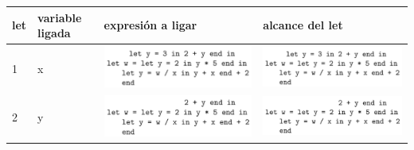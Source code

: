 \documentclass{article}
\begin{document}
\begin{enumerate}
{\begin{enumerate}
{            		\begin{table}[H]
            			\centering
            			\begin{tabular}{|l|l|l|l|}
            				\hline
            				let & variable ligada & expresión a ligar & alcance del let \\ \hline
            				1   & x               & 
            				\begin{minipage}{.3\textwidth}
            					\includegraphics[width=\linewidth, height=.25\linewidth]{x1.png}
            				\end{minipage}
            			     & \begin{minipage}{.3\textwidth}
            			         \includegraphics[width=\linewidth, 
            			        height=.25\linewidth]{x1.png}
            		       \end{minipage}                \\ \hline
            				2   & y               & \begin{minipage}{.3\textwidth}
            					\includegraphics[width=\linewidth, height=.25\linewidth]{y1.png}
            				\end{minipage}                  &  \begin{minipage}{.3\textwidth}
            				\includegraphics[width=\linewidth, height=.25\linewidth]{y1.png}

\end{minipage}
\end{tabular}
\end{table}}
\end{enumerate}}
\end{enumerate}
\end{document}
